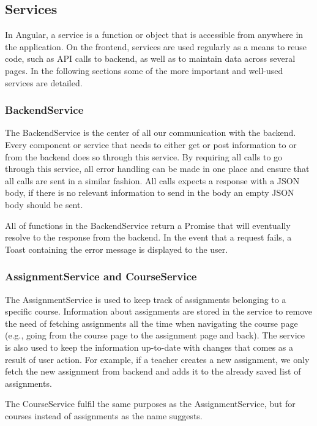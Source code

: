 \subsection{Services}
In Angular, a service is a function or object that is accessible from anywhere in the application. On the frontend, services are used regularly as a means to reuse code, such as API calls to backend, as well as to maintain data across several pages. In the following sections some of the more important and well-used services are detailed.

\subsubsection{BackendService}
The BackendService is the center of all our communication with the backend. Every component or service that needs to either get or post information to or from the backend does so through this service. By requiring all calls to go through this service, all error handling can be made in one place and ensure that all calls are sent in a similar fashion. All calls expects a response with a JSON body, if there is no relevant information to send in the body an empty JSON body should be sent.

All of functions in the BackendService return a Promise that will eventually resolve to the response from the backend. In the event that a request fails, a Toast containing the error message is displayed to the user. 

\subsubsection{AssignmentService and CourseService}
The AssignmentService is used to keep track of assignments belonging to a specific course. Information about assignments are stored in the service to remove the need of fetching assignments all the time when navigating the course page (e.g., going from the course page to the assignment page and back). The service is also used to keep the information up-to-date with changes that comes as a result of user action. For example, if a teacher creates a new assignment, we only fetch the new assignment from backend and adds it to the already saved list of assignments.

The CourseService fulfil the same purposes as the AssignmentService, but for courses instead of assignments as the name suggests.
